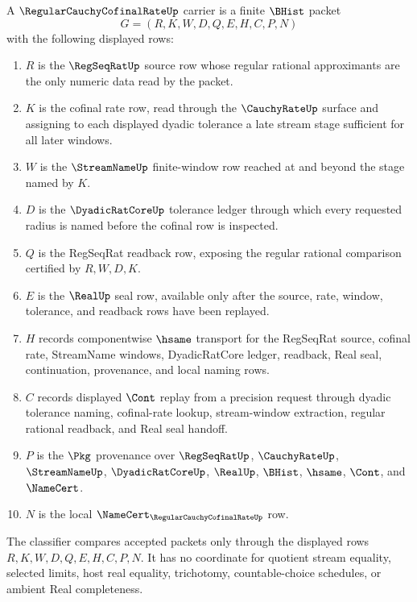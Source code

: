 \begin{definition}
\label{def:regular-cauchy-cofinal-rate-carrier}
A $\RegularCauchyCofinalRateUp$ carrier is a finite $\BHist$ packet
$$
G=(R,K,W,D,Q,E,H,C,P,N)
$$
with the following displayed rows:
\begin{enumerate}
\item $R$ is the $\RegSeqRatUp$ source row whose regular rational approximants are the only numeric data read by the packet.
\item $K$ is the cofinal rate row, read through the $\CauchyRateUp$ surface and assigning to each displayed dyadic tolerance a late stream stage sufficient for all later windows.
\item $W$ is the $\StreamNameUp$ finite-window row reached at and beyond the stage named by $K$.
\item $D$ is the $\DyadicRatCoreUp$ tolerance ledger through which every requested radius is named before the cofinal row is inspected.
\item $Q$ is the RegSeqRat readback row, exposing the regular rational comparison certified by $R,W,D,K$.
\item $E$ is the $\RealUp$ seal row, available only after the source, rate, window, tolerance, and readback rows have been replayed.
\item $H$ records componentwise $\hsame$ transport for the RegSeqRat source, cofinal rate, StreamName windows, DyadicRatCore ledger, readback, Real seal, continuation, provenance, and local naming rows.
\item $C$ records displayed $\Cont$ replay from a precision request through dyadic tolerance naming, cofinal-rate lookup, stream-window extraction, regular rational readback, and Real seal handoff.
\item $P$ is the $\Pkg$ provenance over $\RegSeqRatUp$, $\CauchyRateUp$, $\StreamNameUp$, $\DyadicRatCoreUp$, $\RealUp$, $\BHist$, $\hsame$, $\Cont$, and $\NameCert$.
\item $N$ is the local $\NameCert_{\RegularCauchyCofinalRateUp}$ row.
\end{enumerate}
The classifier compares accepted packets only through the displayed rows $R,K,W,D,Q,E,H,C,P,N$. It has no coordinate for quotient stream equality, selected limits, host real equality, trichotomy, countable-choice schedules, or ambient Real completeness.
\end{definition}

